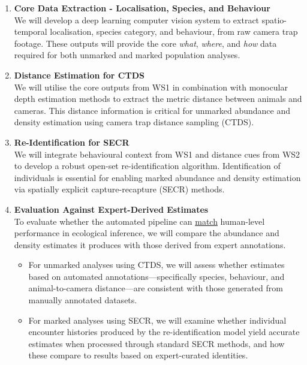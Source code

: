 \begin{enumerate}[label=\textbf{WS\arabic*:}]
      \item \textbf{Core Data Extraction - Localisation, Species, and Behaviour} \\
            We will develop a deep learning computer vision system to extract spatio-temporal localisation, species category, and behaviour, from raw camera trap footage. These outputs will provide the core \textit{what}, \textit{where}, and \textit{how} data required for both unmarked and marked population analyses.

      \item \textbf{Distance Estimation for CTDS} \\
            We will utilise the core outputs from WS1 in combination with monocular depth estimation methods to extract the metric distance between animals and cameras. This distance information is critical for unmarked abundance and density estimation using camera trap distance sampling (CTDS).

      \item \textbf{Re-Identification for SECR} \\
            We will integrate behavioural context from WS1 and distance cues from WS2 to develop a robust open-set re-identification algorithm. Identification of individuals is essential for enabling marked abundance and density estimation via spatially explicit capture-recapture (SECR) methods.

      \item \textbf{Evaluation Against Expert-Derived Estimates} \\
            To evaluate whether the automated pipeline can \underline{match} human-level performance in ecological inference, we will compare the abundance and density estimates it produces with those derived from expert annotations.

            \begin{itemize}
                  \item For unmarked analyses using CTDS, we will assess whether estimates based on automated annotations—specifically species, behaviour, and animal-to-camera distance—are consistent with those generated from manually annotated datasets.
                  \item For marked analyses using SECR, we will examine whether individual encounter histories produced by the re-identification model yield accurate estimates when processed through standard SECR methods, and how these compare to results based on expert-curated identities.
            \end{itemize}


\end{enumerate}
